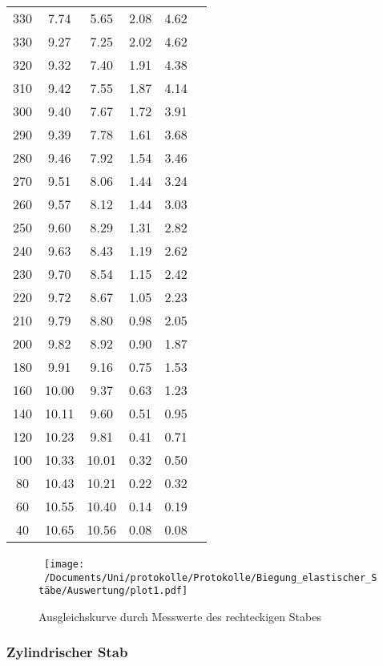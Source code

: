 \begin{table}
\begin{tabular}{c c c c c c}
    330 & 7.74 & 5.65 & 2.08 & 4.62 \\
    330 & 9.27 & 7.25 & 2.02 & 4.62 \\
    320 & 9.32 & 7.40 & 1.91 & 4.38 \\
    310 & 9.42 & 7.55 & 1.87 & 4.14 \\
    300 & 9.40 & 7.67 & 1.72 & 3.91 \\
    290 & 9.39 & 7.78 & 1.61 & 3.68 \\
    280 & 9.46 & 7.92 & 1.54 & 3.46 \\
    270 & 9.51 & 8.06 & 1.44 & 3.24 \\
    260 & 9.57 & 8.12 & 1.44 & 3.03 \\
    250 & 9.60 & 8.29 & 1.31 & 2.82 \\
    240 & 9.63 & 8.43 & 1.19 & 2.62 \\
    230 & 9.70 & 8.54 & 1.15 & 2.42 \\
    220 & 9.72 & 8.67 & 1.05 & 2.23 \\
    210 & 9.79 & 8.80 & 0.98 & 2.05 \\
    200 & 9.82 & 8.92 & 0.90 & 1.87 \\
    180 & 9.91 & 9.16 & 0.75 & 1.53 \\
    160 & 10.00 & 9.37 & 0.63 & 1.23 \\
    140 & 10.11 & 9.60 & 0.51 & 0.95 \\
    120 & 10.23 & 9.81 & 0.41 & 0.71 \\
    100 & 10.33 & 10.01 & 0.32 & 0.50 \\
    80 & 10.43 & 10.21 & 0.22 & 0.32 \\
    60 & 10.55 & 10.40 & 0.14 & 0.19 \\
    40 & 10.65 & 10.56 & 0.08 & 0.08 \\
    \bottomrule
  \end{tabular}
\end{table}

\begin{figure}
  \centering\
  \texttt{[image: ~/Documents/Uni/protokolle/Protokolle/Biegung\_elastischer\_Stäbe/Auswertung/plot1.pdf]}
  \caption{Ausgleichskurve durch Messwerte des rechteckigen Stabes}
  \label{fig:kurveRecht}
\end{figure}

\subsubsection{Zylindrischer Stab}
\label{sec:zylinder}


